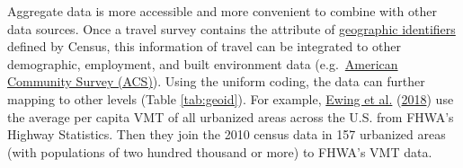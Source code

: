 \documentclass[
  11pt,
  openany]{memoir}
\begin{document}
Aggregate data is more accessible and more convenient to combine with other data sources.
Once a travel survey contains the attribute of \href{https://www.census.gov/programs-surveys/geography/guidance/geo-identifiers.html}{geographic identifiers} defined by Census, this information of travel can be integrated to other demographic, employment, and built environment data (e.g.~\href{https://www.census.gov/programs-surveys/decennial-census/about/census-acs.html}{American Community Survey (ACS)}). Using the uniform coding, the data can further mapping to other levels (Table \ref{tab:geoid}).
For example, \protect\hyperlink{ref-ewingTestingNewmanKenworthy2018}{Ewing et al.} (\protect\hyperlink{ref-ewingTestingNewmanKenworthy2018}{2018}) use the average per capita VMT of all urbanized areas across the U.S. from FHWA's Highway Statistics. Then they join the 2010 census data in 157 urbanized areas (with populations of two hundred thousand or more) to FHWA's VMT data.
\end{document}
